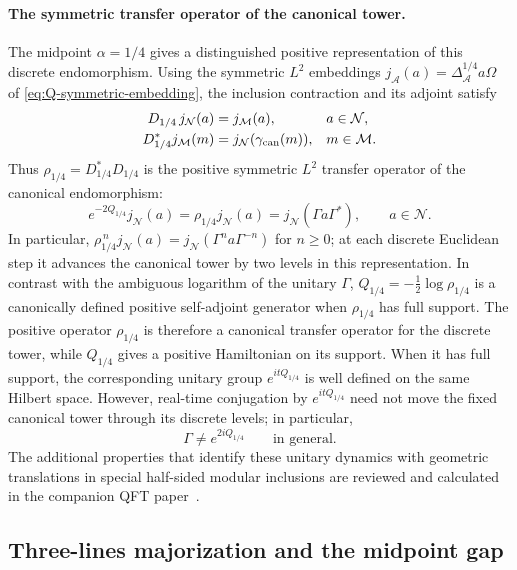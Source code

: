 \documentclass[a4paper,11pt]{article}
\theoremstyle{definition}
\newcommand{\mA}{\mathcal{A}}%
\newcommand{\mN}{\mathcal{N}}
\newcommand{\mM}{\mathcal{M}}
\begin{document}
\paragraph{The symmetric transfer operator of the canonical tower.}
The midpoint $\alpha=1/4$ gives a distinguished positive representation
of this discrete endomorphism. Using the symmetric $L^2$ embeddings
$j_{\mA}(a)=\Delta_{\mA}^{1/4}a\Omega$ of
\eqref{eq:Q-symmetric-embedding}, the inclusion contraction and its
adjoint satisfy
\begin{equation}
 \begin{aligned}
 D_{1/4}\,j_{\mN}(a)&=j_{\mM}(a),&&a\in\mN,\\
 D_{1/4}^*j_{\mM}(m)&=j_{\mN}(\gamma_{\rm can}(m)),&&m\in\mM.
 \end{aligned}
 \label{eq:canonical-L2-adjoint}
\end{equation}
Thus $\rho_{1/4}=D_{1/4}^*D_{1/4}$ is the positive symmetric
$L^2$ transfer operator of the canonical endomorphism:
\begin{equation}
 \boxed{\quad
 e^{-2Q_{1/4}}j_{\mN}(a)
 =\rho_{1/4}j_{\mN}(a)
 =j_{\mN}(\Gamma a\Gamma^*),\qquad a\in\mN.\quad}
 \label{eq:canonical-L2-transfer}
\end{equation}
In particular, $\rho_{1/4}^{\,n}j_{\mN}(a)
=j_{\mN}(\Gamma^n a\Gamma^{-n})$ for $n\geq0$; at each discrete
Euclidean step it advances the canonical tower by two levels in this
representation. In contrast with the ambiguous logarithm of the unitary
$\Gamma$, $Q_{1/4}=-\tfrac12\log\rho_{1/4}$ is a canonically defined
positive self-adjoint generator when $\rho_{1/4}$ has full support.
The positive operator $\rho_{1/4}$ is therefore a canonical transfer operator for the discrete tower, while $Q_{1/4}$ gives a positive Hamiltonian on its support. When it has full support, the corresponding unitary group $e^{itQ_{1/4}}$ is well defined on the same Hilbert space. However, real-time conjugation by $e^{itQ_{1/4}}$ need not move the fixed canonical tower through its discrete levels; in particular,
\begin{equation}
 \Gamma\neq e^{2iQ_{1/4}}\qquad\text{in general}.
 \label{eq:canonical-not-unitary-interpolation}
\end{equation}
The additional properties that identify these unitary dynamics with geometric translations in special half-sided modular inclusions are reviewed and calculated in the companion QFT paper~\cite{companionQFT}.


\subsection{Three-lines majorization and the midpoint gap}
\label{subsec:Q-three-lines}
\end{document}
